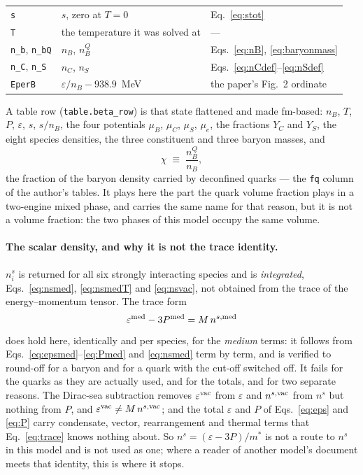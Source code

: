 \documentclass[aps,prc,onecolumn,superscriptaddress,nofootinbib,10pt]{revtex4-2}
\newcommand{\nB}{n_B}
\newcommand{\nC}{n_C}
\newcommand{\nS}{n_S}
\newcommand{\muB}{\mu_B}
\newcommand{\muC}{\mu_C}
\newcommand{\muS}{\mu_S}
\begin{document}
\begin{center}
\begin{tabular}{lll}
\texttt{s}          & $s$, zero at $T = 0$ & Eq.~\eqref{eq:stot} \\
\texttt{T}          & the temperature it was solved at & --- \\
\texttt{n\_b}, \texttt{n\_bQ} & $\nB$, $\nB^Q$
                    & Eqs.~\eqref{eq:nB}, \eqref{eq:baryonmass} \\
\texttt{n\_C}, \texttt{n\_S}  & $\nC$, $\nS$
                    & Eqs.~\eqref{eq:nCdef}--\eqref{eq:nSdef} \\
\texttt{EperB}      & $\varepsilon/\nB - 938.9$~MeV & the paper's Fig.~2 ordinate \\
\bottomrule
\end{tabular}
\end{center}

\noindent
A table row (\texttt{table.beta\_row}) is that state flattened and made
fm-based: $\nB$, $T$, $P$, $\varepsilon$, $s$, $s/\nB$, the four potentials
$\muB$, $\muC$, $\muS$, $\mu_e$, the fractions $Y_C$ and $Y_S$, the eight
species densities, the three constituent and three baryon masses, and
%
\begin{equation}
\chi \;\equiv\; \frac{\nB^Q}{\nB} ,
\label{eq:chi}
\end{equation}
%
the fraction of the baryon density carried by deconfined quarks --- the
\texttt{fq} column of the author's tables. It plays here the part the quark
volume fraction plays in a two-engine mixed phase, and carries the same name
for that reason, but it is not a volume fraction: the two phases of this model
occupy the same volume.

\paragraph{The scalar density, and why it is not the trace identity.} $n^s_i$
is returned for all six strongly interacting species and is \emph{integrated},
Eqs.~\eqref{eq:nsmed}, \eqref{eq:nsmedT} and \eqref{eq:nsvac}, not obtained
from the trace of the energy--momentum tensor. The trace form
%
\begin{equation}
\varepsilon^{\rm med} - 3 P^{\rm med} = M\, n^{s,{\rm med}}
\label{eq:trace}
\end{equation}
%
does hold here, identically and per species, for the \emph{medium} terms: it
follows from Eqs.~\eqref{eq:epsmed}--\eqref{eq:Pmed} and \eqref{eq:nsmed} term
by term, and is verified to round-off for a baryon and for a quark with the
cut-off switched off. It fails for the quarks as they are actually used, and
for the totals, and for two separate reasons. The Dirac-sea subtraction removes
$\varepsilon^{\rm vac}$ from $\varepsilon$ and $n^{s,{\rm vac}}$ from $n^s$ but
nothing from $P$, and $\varepsilon^{\rm vac} \ne M\, n^{s,{\rm vac}}$; and the
total $\varepsilon$ and $P$ of Eqs.~\eqref{eq:eps} and \eqref{eq:P} carry
condensate, vector, rearrangement and thermal terms that Eq.~\eqref{eq:trace}
knows nothing about. So $n^s = (\varepsilon - 3P)/m^*$ is not a route to $n^s$
in this model and is not used as one; where a reader of another model's
document meets that identity, this is where it stops.
\end{document}

